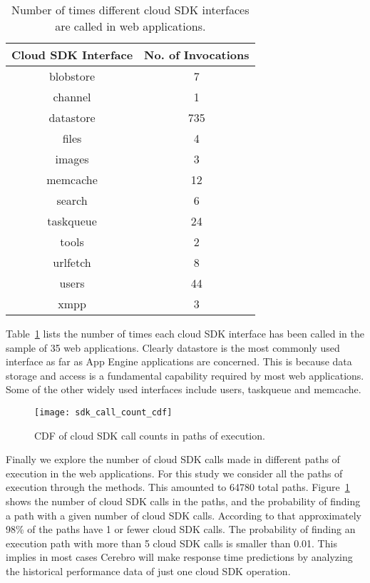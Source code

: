 \begin{table}[htdp]
\caption{Number of times different cloud SDK interfaces are called in web applications.}
\begin{center}
\begin{tabular}{|c|c|}
\hline
Cloud SDK Interface & No. of Invocations \\ \hline
blobstore & 7 \\ \hline
channel & 1 \\ \hline
datastore & 735 \\ \hline
files & 4 \\ \hline
images & 3 \\ \hline
memcache & 12 \\ \hline
search & 6 \\ \hline
taskqueue & 24 \\ \hline
tools & 2 \\ \hline
urlfetch & 8 \\ \hline
users & 44 \\ \hline
xmpp & 3 \\ \hline
\end{tabular}
\end{center}
\label{tab:sdk_call_counts}
\end{table}

Table~\ref{tab:sdk_call_counts} lists the number of times each cloud SDK interface has been called in the sample of
35 web applications. Clearly datastore is the most commonly used interface as far as App Engine applications are 
concerned. This is because data storage and access is a fundamental capability required by most web applications. 
Some of the other widely used interfaces include users, taskqueue and memcache. 

\begin{figure}
\centering
\texttt{[image: sdk\_call\_count\_cdf]}
\caption{CDF of cloud SDK call counts in paths of execution.}
\label{fig:sdk_call_count_cdf}
\end{figure}

Finally we explore the number of cloud SDK calls made in different paths of execution in the web applications. For this study
we consider all the paths of execution through the methods. This amounted to 64780 total paths. Figure~\ref{fig:sdk_call_count_cdf}
shows the number of cloud SDK calls in the paths, and the probability of finding a path with a given number of cloud SDK calls.
According to that approximately 98\% of the paths have 1 or fewer cloud SDK calls. The probability of finding an execution path with more than
5 cloud SDK calls is smaller than 0.01. This implies in most cases Cerebro will make response time predictions by analyzing the
historical performance data of just one cloud SDK operation.